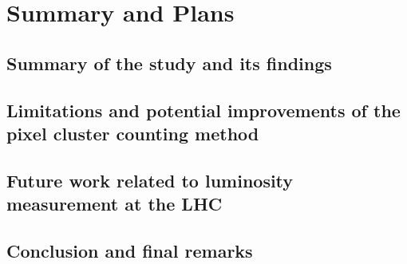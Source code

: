 \section{Summary and Plans} 
\label{sec:con}

\subsection{Summary of the study and its findings}
\subsection{Limitations and potential improvements of the pixel cluster counting method}
\subsection{Future work related to luminosity measurement at the LHC}
\subsection{Conclusion and final remarks}
